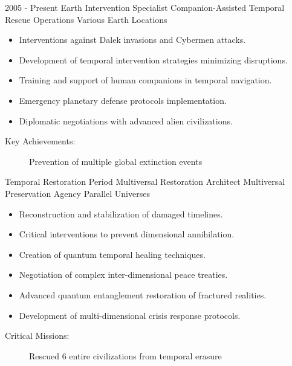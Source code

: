 \begin{cvsubentries}
  \cvsubentry
  {2005 - Present}%
  {Earth Intervention Specialist}%
  {Companion-Assisted Temporal Rescue Operations}%
  {Various Earth Locations}%
  {%
    \begin{itemize}
      \item Interventions against Dalek invasions and Cybermen attacks.
      \item Development of temporal intervention strategies minimizing disruptions.
      \item Training and support of human companions in temporal navigation.
      \item Emergency planetary defense protocols implementation.
      \item Diplomatic negotiations with advanced alien civilizations.
    \end{itemize}
  }{%
    \begin{description}%
      \item[Key Achievements:] Prevention of multiple global extinction events
    \end{description}%
  }

  \cvsubentry
  {Temporal Restoration Period}%
  {Multiversal Restoration Architect}%
  {Multiversal Preservation Agency}%
  {Parallel Universes}%
  {%
    \begin{itemize}
      \item Reconstruction and stabilization of damaged timelines.
      \item Critical interventions to prevent dimensional annihilation.
      \item Creation of quantum temporal healing techniques.
      \item Negotiation of complex inter-dimensional peace treaties.
      \item Advanced quantum entanglement restoration of fractured realities.
      \item Development of multi-dimensional crisis response protocols.
    \end{itemize}
  }{%
    \begin{description}%
      \item[Critical Missions:] Rescued 6 entire civilizations from temporal erasure
    \end{description}%
  }
\end{cvsubentries}


